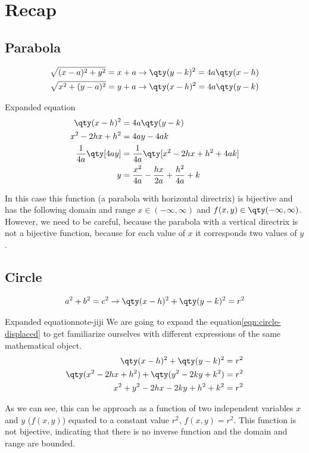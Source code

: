 \documentclass[../main-notes.tex]{subfile}
\begin{document}
\section{Recap}

\subsection{Parabola}


\begin{gather*}
    \sqrt{(x-a)^2 + y^2} = x+a\to\qty(y-k)^2 = 4a\qty(x-h) \\
    \sqrt{x^2 + (y-a)^2} = y+a\to\qty(x-h)^2 = 4a\qty(y-k)
\end{gather*}

\begin{note}{Expanded equation}{~}
 \begin{align*}
    \qty(x-h)^2 &= 4a\qty(y-k) \\
    x^2 -2hx +h^2 &= 4ay-4ak \\
    \frac{1}{4a}\qty[4ay] &=\frac{1}{4a}\qty[x^2 -2hx + h^2 +4ak] \\
    y &=\frac{x^2}{4a} -\frac{hx}{2a} +\frac{h^2}{4a}  +k 
\end{align*}

In this case this function (a parabola with horizontal directrix) is bijective and has the following domain and range $x\in(-\infty,\infty)$ and $f(x,y)\in\qty(-\infty,\infty)$.
However, we need to be careful, because the parabola with a vertical directrix is not a bijective function, because for each value of $x$ it corresponds two values of $y$.
\end{note}

\subsection{Circle}

\begin{gather*}
    a^2 + b^2 = c^2\to\qty(x-h)^2 + \qty(y-k)^2 = r^2
\end{gather*}

\begin{note}{Expanded equation}{note-jiji}
    We are going to expand the equation\eqref{eqn:circle-displaced} to get familiarize ourselves with different expressions of the same mathematical object.
    \begin{align*}
        \qty(x-h)^2 + \qty(y-k)^2 &= r^2 \\
        \qty(x^2 -2hx + h^2) + \qty(y^2 -2ky + k^2) &= r^2 \\
        x^2 + y^2 -2hx -2ky + h^2 + k^2 &= r^2
    \end{align*}

    As we can see, this can be approach as a function of two independent variables $x$ and $y$ ($f(x,y)$) equated to a constant value $r^2$, $f(x,y)=r^2$.
    This function is not bijective, indicating that there is no inverse function and the domain and range are bounded.

\end{note}
\end{document}
